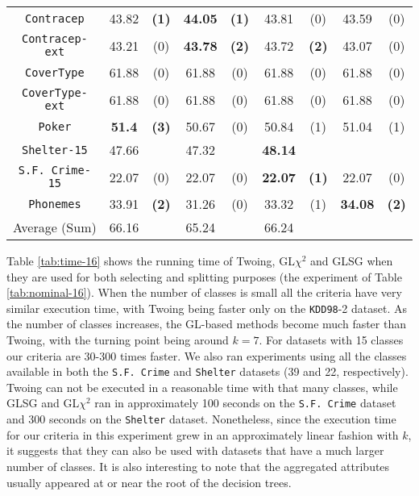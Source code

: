 \begin{table}
\begin{tabular}{c|cc|cc|cc|cc}
{\tt Contracep}     & 43.82      &  {\bf (1)}        &   {\bf 44.05}& {\bf (1)}       &  43.81      &  (0)                 & 43.59       & (0)            \\
{\tt Contracep-ext} & 43.21      &  (0)              &   {\bf 43.78}& {\bf (2)}       &  43.72      &  {\bf (2)}           & 43.07       & (0)            \\
{\tt CoverType}     & 61.88      &  (0)              &   61.88      & (0)             &  61.88      &  (0)                 & 61.88       & (0)            \\
{\tt CoverType-ext} & 61.88      &  (0)              &   61.88      & (0)             &  61.88      &  (0)                 & 61.88       & (0)            \\
{\tt Poker}         & {\bf 51.4} &  {\bf (3)}        &   50.67      & (0)             &  50.84      &  (1)                 & 51.04       & (1)            \\
{\tt Shelter-15}    & 47.66      &                   &   47.32      &                 & {\bf 48.14} &                      &             &                \\
{\tt S.F. Crime-15} & 22.07      &  (0)              &   22.07      & (0)             & {\bf 22.07} &  {\bf (1)}           & 22.07       & (0)            \\
{\tt Phonemes}      & 33.91      &  {\bf (2)}        &   31.26      & (0)             &  33.32      &  (1)                 & {\bf 34.08} & {\bf (2)}      \\
\hline
Average (Sum)       & 66.16      &                   &   65.24      &                 &  66.24      &                      &             &
       \end{tabular}
\normalsize
\label{tab:ctree-16}
\end{table}


Table \ref{tab:time-16} shows the running time of Twoing, GL$\chi^2$ and GLSG  when
they are used for both selecting and splitting purposes (the experiment of Table \ref{tab:nominal-16}).
When the number of classes is small all the criteria have very similar execution time, with Twoing being faster only on the {\tt KDD98}-2 dataset. As the number of classes increases, the GL-based methods become much faster than Twoing, with the turning point being around $k=7$. For datasets with 15 classes our criteria are 30-300 times faster. We also ran experiments using all the classes available in both the {\tt S.F. Crime} and {\tt Shelter} datasets (39 and 22, respectively). Twoing can not be executed in a reasonable time with that many classes, while GLSG and GL$\chi^2$ ran in approximately 100 seconds on the {\tt S.F. Crime} dataset and  300 seconds on the {\tt Shelter} dataset. Nonetheless, since the execution time for our criteria in this experiment grew in an approximately linear fashion with $k$, it suggests that they can also be used with datasets that have a much larger number of classes. It is also interesting to note that the aggregated attributes usually appeared at or near the root of the decision trees.


